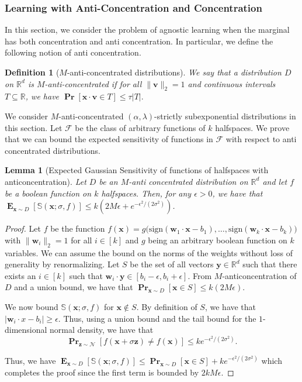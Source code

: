 \documentclass[10pt,a4paper]{article}
\newtheorem{lemma}{Lemma}[section]
\newtheorem{definition}{Definition}[section]
\newcommand\twonorm[1]{\|#1\|_2}
\renewcommand\vec[1]{\mathbf{#1}}
\DeclareMathOperator*{\pr}{\mathbf{Pr}}
\DeclareMathOperator*{\E}{\mathbf{E}}
\newcommand{\R}{\mathbb{R}}
\newcommand{\sign}{\mathrm{sign}}
\newcommand{\1}{\Ind}
\newcommand{\x}{\vec x}
\newcommand{\vv}{\vec v}
\newcommand{\vw}{\vec w}
\newcommand{\z}{\vec z}
\newcommand{\F}{\mathcal{F}}
\newcommand{\Gauss}{\mathcal{N}}
\begin{document}
\subsubsection{Learning with Anti-Concentration and Concentration}
In this section, we consider the problem of agnostic learning when the marginal has both concentration and anti concentration. In particular, we define the following notion of anti concentration.
\begin{definition}[$M$-anti-concentrated distributions]
    We say that a distribution $D$ on $\R^d$ is $M$-anti-concentrated if for all $\twonorm{\vv}=1$ and continuous intervals $T\subseteq \R$, we have  
        \(
          \pr[\x\cdot \vv\in T ]\leq \tau|T|.
        \)
\end{definition}

We consider $M$-anti-concentrated $(\alpha,\lambda)$-strictly subexponential distributions in this section. Let $\F$ be the class of arbitrary functions of $k$ halfspaces. We prove that we can bound the expected sensitivity of functions in $\F$ with respect to anti concentrated distributions.

\begin{lemma}[Expected Gaussian Sensitivity of functions of halfspaces with anticoncentration]
\label{lem:expected_sens_anticonc_halfspace}
    Let $D$ be an $M$-anti concentrated distribution on $\R^{d}$ and let $f$ be a boolean function on $k$ halfspaces. Then, for any $\epsilon>0$, we have that $\E_{\x\sim D}[\mathbb{S}(\x;\sigma,f)]\leq k(2M\epsilon+ e^{-\epsilon^2/(2\sigma^2)}) $.
\end{lemma}
\begin{proof}
    Let $f$ be the function $f(\x)=g\bigl(\sign(\vw_1\cdot\x-b_1),\dots,\sign(\vw_k\cdot \x-b_k)\bigr)$ with $\twonorm{\vw_i}=1$ for all $i\in [k]$ and $g$ being an arbitrary boolean function on $k$ variables. We can assume the bound on the norms of the weights without loss of generality by renormalizing. Let $S$ be the set of all vectors $\vec y\in \R^d$ such that there exists an $i\in[k]$ such that $\vw_i\cdot \vec y\in[b_i-\epsilon,b_i+\epsilon]$. From $M$-anticoncentration of $D$ and a union bound, we have that $\pr_{\x\sim D}[\x\in S]\leq k(2M\epsilon)$.

    We now bound $\mathbb{S}(\x;\sigma,f)$ for $\x\notin S$. By definition of $S$, we have that $|\vw_i\cdot x-b_i|\geq \epsilon$. Thus, using a union bound and the tail bound for the $1$-dimensional normal density, we have that 
    \[
    \pr_{\z\sim \Gauss}[f(\x+\sigma\z)\neq f(\x)]\leq ke^{-\epsilon^2/(2\sigma^2)}.
    \]

    Thus, we have $\E_{\x\sim D}[\mathbb{S}(\x;\sigma,f)]\leq \pr_{\x\sim D}[\x\in S]+ke^{-\epsilon^2/(2\sigma^2)}$ which completes the proof since the first term is bounded by $2kM\epsilon$.
\end{proof}
\end{document}
